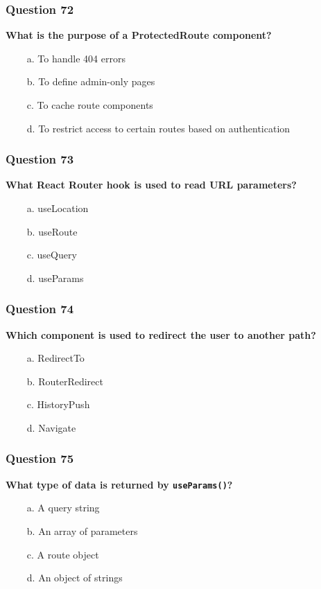 \documentclass{article}
\newcommand{\cmark}{\textcolor{green}{\ding{51}}} %
\newcommand{\xmark}{\textcolor{red}{\ding{55}}}   %
\begin{document}
\subsubsection*{Question 72}
\textbf{What is the purpose of a ProtectedRoute component?}

\begin{itemize}
  \item[\xmark\ a.] To handle 404 errors
  \item[\xmark\ b.] To define admin-only pages
  \item[\xmark\ c.] To cache route components
  \item[\cmark\ d.] To restrict access to certain routes based on authentication
\end{itemize}

\subsubsection*{Question 73}
\textbf{What React Router hook is used to read URL parameters?}

\begin{itemize}
  \item[\xmark\ a.] useLocation
  \item[\xmark\ b.] useRoute
  \item[\xmark\ c.] useQuery
  \item[\cmark\ d.] useParams
\end{itemize}

\subsubsection*{Question 74}
\textbf{Which component is used to redirect the user to another path?}

\begin{itemize}
  \item[\xmark\ a.] RedirectTo
  \item[\xmark\ b.] RouterRedirect
  \item[\xmark\ c.] HistoryPush
  \item[\cmark\ d.] Navigate
\end{itemize}

\subsubsection*{Question 75}
\textbf{What type of data is returned by \texttt{useParams()}?}

\begin{itemize}
  \item[\xmark\ a.] A query string
  \item[\xmark\ b.] An array of parameters
  \item[\xmark\ c.] A route object
  \item[\cmark\ d.] An object of strings
\end{itemize}
\end{document}
